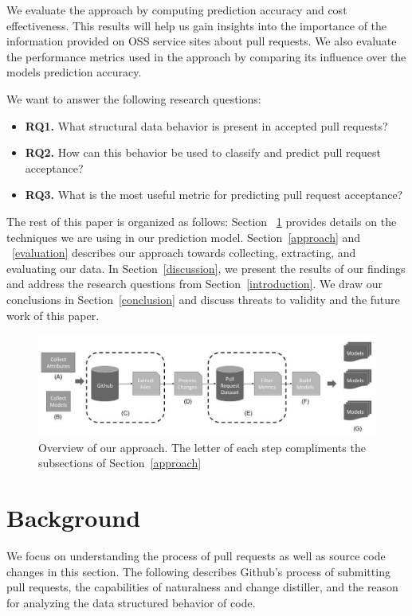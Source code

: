 \documentclass[10pt, conference]{IEEEtran}
\begin{document}
We evaluate the approach by computing prediction accuracy and cost effectiveness. This results will help us gain insights into the importance of the information provided on OSS service sites about pull requests. We also evaluate the performance metrics used in the approach by comparing its influence over the model\textquotesingle s prediction accuracy. 

We want to answer the following research questions:
\begin{mdframed} 
\begin{itemize}
\item \textbf{RQ1.} What structural data behavior is present in accepted pull requests?
\item \textbf{RQ2.} How can this behavior be used to classify and predict pull request acceptance?
\item \textbf{RQ3.} What is the most useful metric for predicting pull request acceptance?
\end{itemize}
\end{mdframed}

The rest of this paper is organized as follows: 
Section ~\ref{background} provides details on the techniques we are using in our prediction model. Section~\ref{approach} and ~\ref{evaluation} describes our approach towards collecting, extracting, and evaluating our data. In Section~\ref{discussion}, we present the results of our findings and address the research questions from Section~\ref{introduction}. We draw our conclusions in Section~\ref{conclusion} and discuss threats to validity and the future work of this paper.

\begin{figure}
  \includegraphics[width=\linewidth]{FlowChart.jpg}
  \caption{Overview of our approach. The letter of each step compliments the subsections of Section~\ref{approach}}
  \label{fig:FlowChart}
\end{figure}

\section{Background}
\label{background}
We focus on understanding the process of pull requests as well as source code changes in this section. The following describes Github's process of submitting pull requests, the capabilities of naturalness and change distiller, and the reason for analyzing the data structured behavior of code.
\end{document}
